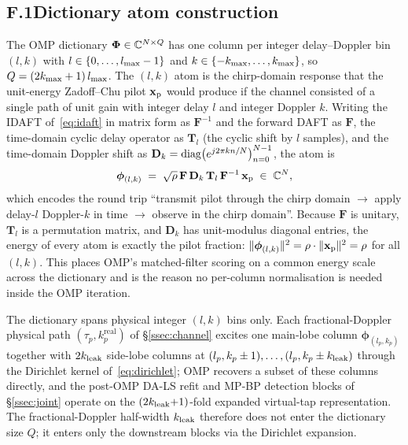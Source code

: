 \subsection*{F.1\quad Dictionary atom construction}

The OMP dictionary $\boldsymbol{\Phi} \in \mathbb{C}^{N \times Q}$ has one column per integer delay--Doppler bin $(l, k)$ with $l \in \{0, \dots, l_{\max} - 1\}$ and $k \in \{-k_{\max}, \dots, k_{\max}\}$, so $Q = (2k_{\max} + 1)\,l_{\max}$. The $(l, k)$ atom is the chirp-domain response that the unit-energy Zadoff--Chu pilot $\mathbf{x}_{\mathrm{p}}$ would produce if the channel consisted of a single path of unit gain with integer delay $l$ and integer Doppler $k$. Writing the IDAFT of~\eqref{eq:idaft} in matrix form as $\mathbf{F}^{-1}$ and the forward DAFT as $\mathbf{F}$, the time-domain cyclic delay operator as $\mathbf{T}_l$ (the cyclic shift by $l$ samples), and the time-domain Doppler shift as $\mathbf{D}_k = \mathrm{diag}\bigl(e^{j 2\pi k n / N}\bigr)_{n=0}^{N-1}$, the atom is
\begin{equation}
\boldsymbol{\phi}_{(l,k)} \;=\; \sqrt{\rho}\, \mathbf{F}\, \mathbf{D}_k\, \mathbf{T}_l\, \mathbf{F}^{-1}\, \mathbf{x}_{\mathrm{p}} \;\in\; \mathbb{C}^{N}, \label{eq:atom_construction}
\end{equation}
which encodes the round trip ``transmit pilot through the chirp domain $\to$ apply delay-$l$ Doppler-$k$ in time $\to$ observe in the chirp domain''. Because $\mathbf{F}$ is unitary, $\mathbf{T}_l$ is a permutation matrix, and $\mathbf{D}_k$ has unit-modulus diagonal entries, the energy of every atom is exactly the pilot fraction: $\|\boldsymbol{\phi}_{(l,k)}\|^2 = \rho \cdot \|\mathbf{x}_{\mathrm{p}}\|^2 = \rho$ for all $(l, k)$. This places OMP's matched-filter scoring on a common energy scale across the dictionary and is the reason no per-column normalisation is needed inside the OMP iteration.

The dictionary spans physical integer $(l, k)$ bins only. Each fractional-Doppler physical path $(\tau_p, k_p^\text{real})$ of \S\ref{ssec:channel} excites one main-lobe column $\boldsymbol{\phi}_{(l_p, k_p)}$ together with $2k_{\mathrm{leak}}$ side-lobe columns at $(l_p, k_p \pm 1), \dots, (l_p, k_p \pm k_{\mathrm{leak}})$ through the Dirichlet kernel of~\eqref{eq:dirichlet}; OMP recovers a subset of these columns directly, and the post-OMP DA-LS refit and MP-BP detection blocks of \S\ref{ssec:joint} operate on the $(2k_{\mathrm{leak}}{+}1)$-fold expanded virtual-tap representation. The fractional-Doppler half-width $k_{\mathrm{leak}}$ therefore does not enter the dictionary size $Q$; it enters only the downstream blocks via the Dirichlet expansion.

